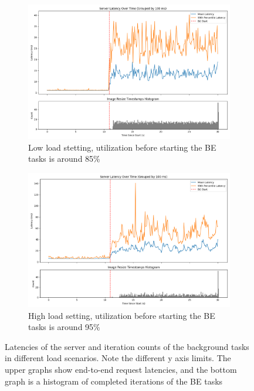 \begin{figure}[t]
    \centering
    \begin{subfigure}[b]{0.49\columnwidth}
        \includegraphics[width=\columnwidth]{graphs/srv-bg-unedited-low.png}
        \caption{Low load stetting, utilization before starting the BE tasks is
        around 85\%}\label{fig:srv-bg-unedited-low}
    \end{subfigure}
    \hspace{\fill}
    \begin{subfigure}[b]{0.49\columnwidth}
        \includegraphics[width=\columnwidth]{graphs/srv-bg-unedited-high.png}
        \caption{High load setting, utilization before starting the BE tasks is
        around 95\%}\label{fig:srv-bg-unedited-high}
    \end{subfigure}
    \vspace{4pt}
    \caption{Latencies of the server and iteration counts of the background
    tasks in different load scenarios. Note the different y axis limits. The
    upper graphs show end-to-end request latencies, and the bottom graph is a
    histogram of completed iterations of the BE tasks}\label{fig:srv-bg-unedited}
\end{figure}

